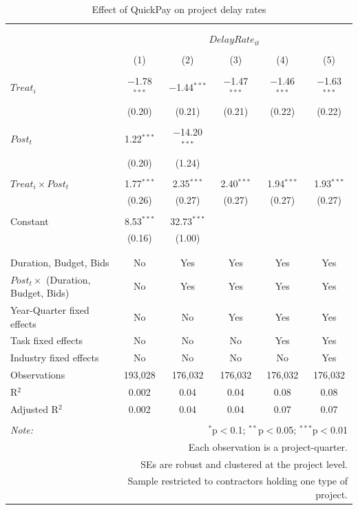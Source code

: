 \documentclass[
]{article}
\begin{document}
\begin{table}[H] \centering 
  \caption{Effect of QuickPay on project delay rates} 
  \label{} 
\small 
\begin{tabular}{@{\extracolsep{-2pt}}lccccc} 
\\[-1.8ex]\hline 
\hline \\[-1.8ex] 
\\[-1.8ex] & \multicolumn{5}{c}{$DelayRate_{it}$} \\ 
\\[-1.8ex] & (1) & (2) & (3) & (4) & (5)\\ 
\hline \\[-1.8ex] 
 $Treat_i$ & $-$1.78$^{***}$ & $-$1.44$^{***}$ & $-$1.47$^{***}$ & $-$1.46$^{***}$ & $-$1.63$^{***}$ \\ 
  & (0.20) & (0.21) & (0.21) & (0.22) & (0.22) \\ 
  & & & & & \\ 
 $Post_t$ & 1.22$^{***}$ & $-$14.20$^{***}$ &  &  &  \\ 
  & (0.20) & (1.24) &  &  &  \\ 
  & & & & & \\ 
 $Treat_i \times Post_t$ & 1.77$^{***}$ & 2.35$^{***}$ & 2.40$^{***}$ & 1.94$^{***}$ & 1.93$^{***}$ \\ 
  & (0.26) & (0.27) & (0.27) & (0.27) & (0.27) \\ 
  & & & & & \\ 
 Constant & 8.53$^{***}$ & 32.73$^{***}$ &  &  &  \\ 
  & (0.16) & (1.00) &  &  &  \\ 
  & & & & & \\ 
\hline \\[-1.8ex] 
Duration, Budget, Bids & No & Yes & Yes & Yes & Yes \\ 
$Post_t \times$  (Duration, Budget, Bids) & No & Yes & Yes & Yes & Yes \\ 
Year-Quarter fixed effects & No & No & Yes & Yes & Yes \\ 
Task fixed effects & No & No & No & Yes & Yes \\ 
Industry fixed effects & No & No & No & No & Yes \\ 
Observations & 193,028 & 176,032 & 176,032 & 176,032 & 176,032 \\ 
R$^{2}$ & 0.002 & 0.04 & 0.04 & 0.08 & 0.08 \\ 
Adjusted R$^{2}$ & 0.002 & 0.04 & 0.04 & 0.07 & 0.07 \\ 
\hline 
\hline \\[-1.8ex] 
\textit{Note:}  & \multicolumn{5}{r}{$^{*}$p$<$0.1; $^{**}$p$<$0.05; $^{***}$p$<$0.01} \\ 
 & \multicolumn{5}{r}{Each observation is a project-quarter.} \\ 
 & \multicolumn{5}{r}{SEs are robust and clustered at the project level.} \\ 
 & \multicolumn{5}{r}{Sample restricted to contractors holding one type of project.} \\ 
\end{tabular} 
\end{table}
\end{document}

